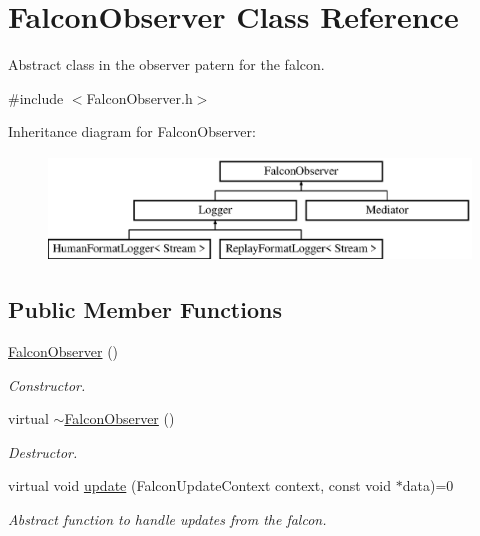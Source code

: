 \hypertarget{classFalconObserver}{
\section{FalconObserver Class Reference}
\label{classFalconObserver}
}


Abstract class in the observer patern for the falcon.  




{\ttfamily \#include $<$FalconObserver.h$>$}

Inheritance diagram for FalconObserver:\begin{figure}[H]
\begin{center}
\leavevmode
\includegraphics[height=2.786070cm]{classFalconObserver}
\end{center}
\end{figure}
\subsection*{Public Member Functions}
\begin{DoxyCompactItemize}
\item 
\hypertarget{classFalconObserver_a6e2796122307df713a5f2da8388eaadf}{
\hyperlink{classFalconObserver_a6e2796122307df713a5f2da8388eaadf}{FalconObserver} ()}
\label{classFalconObserver_a6e2796122307df713a5f2da8388eaadf}

\begin{DoxyCompactList}\small\item\em Constructor. \item\end{DoxyCompactList}\item 
\hypertarget{classFalconObserver_a4c2fee66c8fd444980960496f8c25374}{
virtual \hyperlink{classFalconObserver_a4c2fee66c8fd444980960496f8c25374}{$\sim$FalconObserver} ()}
\label{classFalconObserver_a4c2fee66c8fd444980960496f8c25374}

\begin{DoxyCompactList}\small\item\em Destructor. \item\end{DoxyCompactList}\item 
virtual void \hyperlink{classFalconObserver_a6a6dd6934aefdb9de8e94b089b21e1b9}{update} (FalconUpdateContext context, const void $\ast$data)=0
\begin{DoxyCompactList}\small\item\em Abstract function to handle updates from the falcon. \item\end{DoxyCompactList}\end{DoxyCompactItemize}



